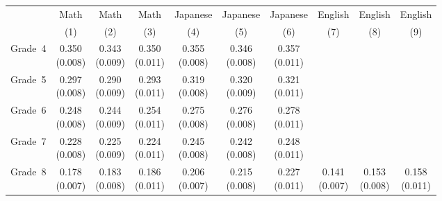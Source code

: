 \begin{tabular}{lccccccccc}
\hline \hline 
 & Math & Math & Math & Japanese & Japanese & Japanese & English & English & English \\
 & (1) & (2) & (3) & (4) & (5) & (6) & (7) & (8) & (9) \\
\hline 
Grade~4 & \makecell[tc]{0.350\\(0.008)} & \makecell[tc]{0.343\\(0.009)} & \makecell[tc]{0.350\\(0.011)} & \makecell[tc]{0.355\\(0.008)} & \makecell[tc]{0.346\\(0.008)} & \makecell[tc]{0.357\\(0.011)} &  &  &  \\
Grade~5 & \makecell[tc]{0.297\\(0.008)} & \makecell[tc]{0.290\\(0.009)} & \makecell[tc]{0.293\\(0.011)} & \makecell[tc]{0.319\\(0.008)} & \makecell[tc]{0.320\\(0.009)} & \makecell[tc]{0.321\\(0.011)} &  &  &  \\
Grade~6 & \makecell[tc]{0.248\\(0.008)} & \makecell[tc]{0.244\\(0.009)} & \makecell[tc]{0.254\\(0.011)} & \makecell[tc]{0.275\\(0.008)} & \makecell[tc]{0.276\\(0.008)} & \makecell[tc]{0.278\\(0.011)} &  &  &  \\
Grade~7 & \makecell[tc]{0.228\\(0.008)} & \makecell[tc]{0.225\\(0.009)} & \makecell[tc]{0.224\\(0.011)} & \makecell[tc]{0.245\\(0.008)} & \makecell[tc]{0.242\\(0.008)} & \makecell[tc]{0.248\\(0.011)} &  &  &  \\
Grade~8 & \makecell[tc]{0.178\\(0.007)} & \makecell[tc]{0.183\\(0.008)} & \makecell[tc]{0.186\\(0.011)} & \makecell[tc]{0.206\\(0.007)} & \makecell[tc]{0.215\\(0.008)} & \makecell[tc]{0.227\\(0.011)} & \makecell[tc]{0.141\\(0.007)} & \makecell[tc]{0.153\\(0.008)} & \makecell[tc]{0.158\\(0.011)} \\

\end{tabular}
